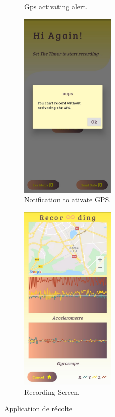 \begin{figure}[h!]
\begin{subfigure}{.50\textwidth}
        \caption{Gps activating alert.}
        \label{fig:GpsAcivate}
    \end{subfigure}
    \begin{subfigure}{.50\textwidth}
        \center
        \includegraphics[width=0.50\textwidth]{Images/recordingApp/noGpsAlert.jpg}
        \caption{Notification to ativate GPS.}
        \label{fig:gpsNotif}
    \end{subfigure}
    \begin{subfigure}{.50\textwidth}
        \center
        \includegraphics[width=0.50\textwidth]{Images/recordingApp/recordingScreen.jpg}
        \caption{Recording Screen.}
        \label{fig:Recording}
    \end{subfigure}
    \caption{Application de récolte}
    \label{fig:app_recolte}
\end{figure}

